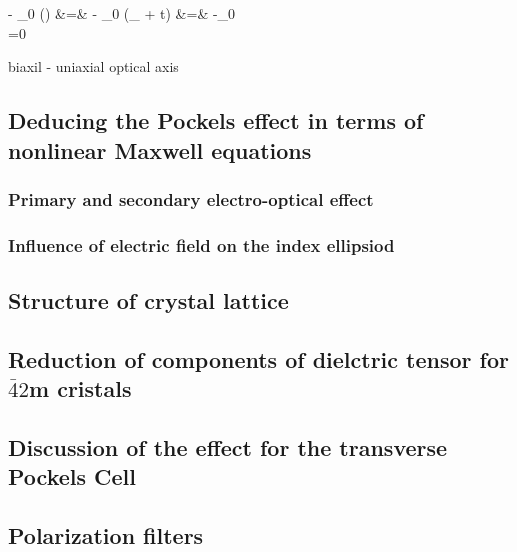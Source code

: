     - \mu_0  \left(\nabla \times {}\right) &=&\nn
    - \mu_0  \left(_ + 
         {\partial t}\right) &=&\nn
     -\mu_0   \\
\nabla \cdot {} =0
\eea



biaxil - uniaxial 
optical axis 


\subsection{Deducing the Pockels effect in terms of nonlinear Maxwell equations}
\subsubsection{Primary and secondary electro-optical effect}
\subsubsection{Influence of electric field on the index ellipsiod}

\subsection{Structure of crystal lattice}

\subsection{Reduction of components of dielctric tensor for $\bar{4}2$m cristals}

\subsection{Discussion of the effect for the transverse Pockels Cell}

\subsection{Polarization filters}

